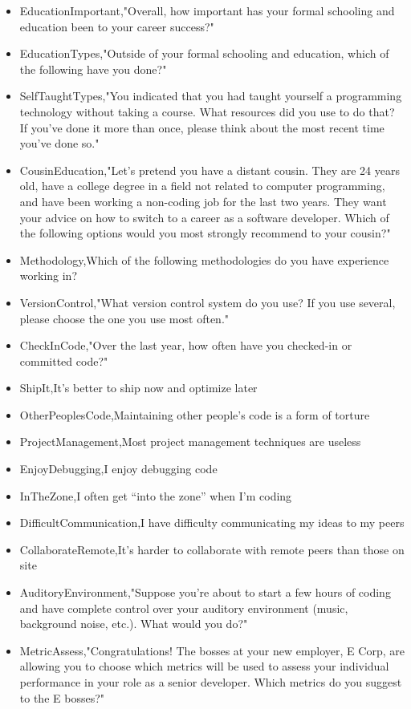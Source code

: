 \begin{appendices}
\begin{itemize}
        \item EducationImportant,"Overall, how important has your formal schooling and education been to your career success?"
        \item EducationTypes,"Outside of your formal schooling and education, which of the following have you done?"
        \item SelfTaughtTypes,"You indicated that you had taught yourself a programming technology without taking a course. What resources did you use to do that? If you've done it more than once, please think about the most recent time you've done so."
        \item CousinEducation,"Let's pretend you have a distant cousin. They are 24 years old, have a college degree in a field not related to computer programming, and have been working a non-coding job for the last two years. They want your advice on how to switch to a career as a software developer. Which of the following options would you most strongly recommend to your cousin?"
        \item Methodology,Which of the following methodologies do you have experience working in?
        \item VersionControl,"What version control system do you use? If you use several, please choose the one you use most often."
        \item CheckInCode,"Over the last year, how often have you checked-in or committed code?"
        \item ShipIt,It's better to ship now and optimize later
        \item OtherPeoplesCode,Maintaining other people's code is a form of torture
        \item ProjectManagement,Most project management techniques are useless
        \item EnjoyDebugging,I enjoy debugging code
        \item InTheZone,I often get “into the zone” when I'm coding
        \item DifficultCommunication,I have difficulty communicating my ideas to my peers
        \item CollaborateRemote,It's harder to collaborate with remote peers than those on site
        \item AuditoryEnvironment,"Suppose you're about to start a few hours of coding and have complete control over your auditory environment (music, background noise, etc.). What would you do?"
        \item MetricAssess,"Congratulations! The bosses at your new employer, E Corp, are allowing you to choose which metrics will be used to assess your individual performance in your role as a senior developer. Which metrics do you suggest to the E bosses?"

\end{itemize}
\end{appendices}

